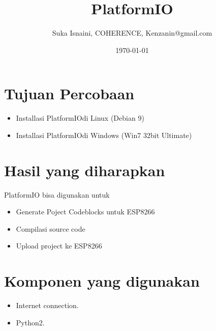 
\def \TITLE     {PlatformIO }
\def \AUTHOR    {Suka Isnaini, COHERENCE, Kenzanin@gmail.com}
\def \SUBJECT   {ESP8266 }
\def \KEYWORDS  {Python, Python-PIP, PlatformIO}



\newcommand{\pio}{PlatformIO}
\newcommand{\python}{Python}



\title{\TITLE}

\author{\AUTHOR}

\date{\today}

\maketitle
\tableofcontents
\newpage

\section{Tujuan Percobaan}
\begin{itemize}
\item Installasi \pio di Linux (Debian 9)
\item Installasi \pio di Windows (Win7 32bit Ultimate)
\end{itemize}

\section{Hasil yang diharapkan}
PlatformIO bisa digunakan untuk
\begin{itemize}
\item Generate Poject Codeblocks untuk ESP8266
\item Compilasi source code
\item Upload project ke ESP8266
\end{itemize}

\section{Komponen yang digunakan}
\begin{itemize}
\item Internet connection.
\item Python2.
\end{itemize}

